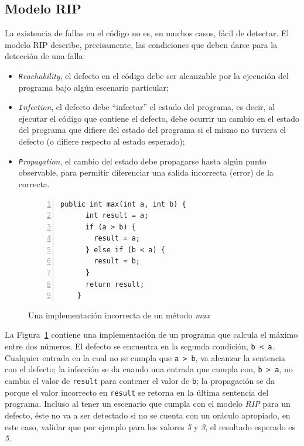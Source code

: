\subsection{Modelo RIP}

La existencia de fallas en el c\'odigo no es, en muchos casos, f\'acil de detectar. El modelo RIP describe, precisamente, las condiciones que deben darse para la detecci\'on de una falla: 
\begin{itemize}
\item \emph{\texttt{R}eachability}, el defecto en el c\'odigo debe ser alcanzable por la ejecuci\'on del programa bajo alg\'un escenario particular;
\item \emph{\texttt{I}nfection}, el defecto debe ``infectar'' el estado del programa, es decir, al ejecutar el c\'odigo que contiene el defecto, debe ocurrir un cambio en el estado del programa que difiere del estado del programa si el mismo no tuviera el defecto (o difiere respecto al estado esperado); 
\item \emph{\texttt{P}ropagation}, el cambio del estado debe propagarse hasta alg\'un punto observable, para permitir diferenciar una salida incorrecta (error) de la correcta.
\end{itemize}

\begin{figure}
	\begin{lstlisting}[frame=single,numbers=left, mathescape=true,framexleftmargin=1.5em]
    public int max(int a, int b) {
      int result = a;
      if (a > b) {
        result = a;
      } else if (b < a) {
        result = b;
      }
      return result;
    }
	\end{lstlisting}
	\caption{Una implementaci\'on incorrecta de un m\'etodo \emph{max}}
	\label{figures.examples.testing.rip}
\end{figure}

La Figura~\ref{figures.examples.testing.rip} contiene una implementaci\'on de un programa que calcula el m\'aximo entre dos n\'umeros. El defecto se encuentra en la segunda condici\'on, \texttt{b < a}. Cualquier entrada en la cual no se cumpla que \texttt{a > b}, va alcanzar la sentencia con el defecto; la infecci\'on se da cuando una entrada que cumpla con, \texttt{b > a}, no cambia el valor de \texttt{result} para contener el valor de \texttt{b}; la propagaci\'on se da porque el valor incorrecto en \texttt{result} se retorna en la \'ultima sentencia del programa. Incluso al tener un escenario que cumpla con el modelo \emph{RIP} para un defecto, \'este no va a ser detectado si no se cuenta con un or\'aculo apropiado, en este caso, validar que por ejemplo para los valores \emph{5} y \emph{3}, el resultado esperado es \emph{5}.

